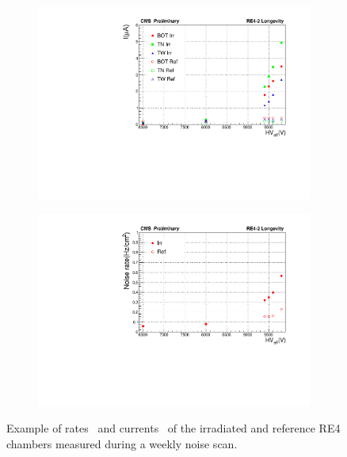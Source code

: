 	\begin{figure}[H]
    	\begin{subfigure}{0.5\linewidth}
			\centering
    		\includegraphics[width = \linewidth]{fig/chapt5/Weekly-noise-Scan-Currents.pdf}
        	\caption{\label{fig:weekly-noise:A}}
    	\end{subfigure}
    	\begin{subfigure}{0.5\linewidth}
			\centering
    		\includegraphics[width = \linewidth]{fig/chapt5/Weekly-noise-Scan-Rates.pdf}
        	\caption{\label{fig:weekly-noise:B}}
    	\end{subfigure}
		\caption{\label{fig:weekly-noise} Example of rates~ and currents~ of the irradiated and reference RE4 chambers measured during a weekly noise scan.}
	\end{figure}
	
